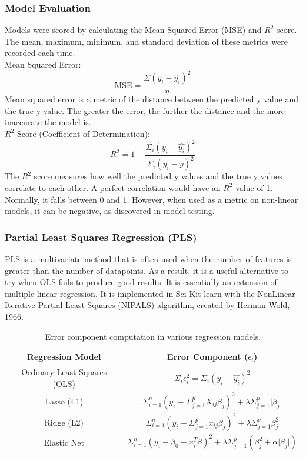 \documentclass[11pt, titlepage]{article}
\begin{document}
\subsubsection{Model Evaluation}
Models were scored by calculating the Mean Squared Error (MSE) and $R^2$ score. The mean, maximum, minimum, and standard deviation of these metrics were recorded each time.\\
\newline
Mean Squared Error:\\
$$\text{MSE} = \frac{\Sigma(y_{i}-\hat{y}_{i})^{2}}{n}$$
Mean squared error is a metric of the distance between the predicted y value and the true y value. The greater the error, the further the distance and the more inaccurate the model is\cite{mse}.\\
\newline
$R^{2}$ Score (Coefficient of Determination):\\
$$R^{2} = 1 - \frac{\Sigma_{i}(y_{i} - \hat{y_{i}})^{2}}{\Sigma_{i}(y_{i}-\bar{y})^{2}}$$
The $R^{2}$ score measures how well the predicted y values and the true y values correlate to each other\cite{r2}. A perfect correlation would have an $R^{2}$ value of 1. Normally, it falls between 0 and 1. However, when used as a metric on non-linear models, it can be negative, as discovered in model testing.

\subsubsection{Partial Least Squares Regression (PLS)}
PLS is a multivariate method that is often used when the number of features is greater than the number of datapoints\cite{pls1}. As a result, it is a useful alternative to try when OLS fails to produce good results. It is essentially an extension of multiple linear regression\cite{pls2}. It is implemented in Sci-Kit learn with the NonLinear Iterative Partial Least Squares (NIPALS) algorithm, created by Herman Wold, 1966\cite{nipals}.

\begin{table}[h!]
\centering
\begin{tabular}{|c|c|}
\hline
\textbf{Regression Model} & \textbf{Error Component ($\epsilon_{i}$)} \\ 
\hline
Ordinary Least Squares (OLS)\cite{ols} & $\Sigma_{i}\epsilon^{2}_{i} = \Sigma_{i}(y_{i}-\hat{y_{i}})^{2}$ \\ 
\hline
Lasso (L1)\cite{lasso} & $\Sigma_{i=1}^{n}(y_{i}-\Sigma_{j=1}^{p}X_{ij}\beta_{j})^{2}+\lambda\Sigma^{p}_{j=1}\vert\beta_{j}\vert$ \\ 
\hline
Ridge (L2)\cite{elastic} & $\Sigma_{i=1}^{n}(y_{i}-\Sigma_{j=1}^{p}x_{ij}\beta_{j})^{2}+\lambda\Sigma_{j=1}^{p}\beta_{j}^{2}$ \\ 
\hline
Elastic Net & $\Sigma_{i=1}^{n}(y_{i}-\beta_{0}-x^{T}_{i}\beta)^{2}+\lambda\Sigma^{p}_{j=1}(\beta^{2}_{j}+\alpha\vert\beta_{j}\vert)$ \\ 
\hline
\end{tabular}
\caption{Error component computation in various regression models.}
\label{table:regression_models}
\end{table}
\end{document}
